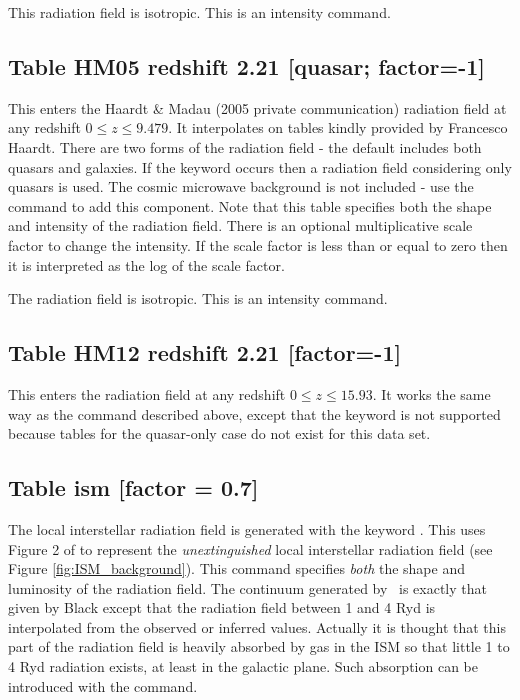 This radiation field is isotropic.
This is an intensity command.

\subsection{Table HM05 redshift 2.21 [quasar; factor=-1]}

This enters the Haardt \& Madau (2005 private communication)
radiation field at any redshift $0 \le z \le 9.479$.  It
interpolates on tables kindly provided by Francesco Haardt.  There are
two forms of the radiation field - the default includes both quasars
and galaxies.  If the keyword  occurs then a
radiation field considering only quasars is used.  The cosmic
microwave background is not included - use the  command
to add this component.  Note that this table specifies both the shape
and intensity of the radiation field.  There is an optional
multiplicative scale factor to change the intensity.  If the scale
factor is less than or equal to zero then it is interpreted as the log
of the scale factor.

The radiation field is isotropic.
This is an intensity command.

\subsection{Table HM12 redshift 2.21 [factor=-1]}

This enters the \citet{HaardtMadau2012} radiation field at any redshift $0 \le
z \le 15.93$. It works the same way as the  command
described above, except that the keyword  is not supported
because tables for the quasar-only case do not exist for this data set.

\subsection{Table ism [factor = 0.7]}

The local interstellar radiation field is generated with the keyword
.
This uses Figure 2 of \citet{Black1987} to represent the
\emph{unextinguished}
local interstellar radiation field (see Figure \ref{fig:ISM_background}).  This command specifies
\emph{both} the shape and luminosity of the radiation field.
The continuum
generated by \Cloudy\ is exactly that given by Black except that the radiation
field between 1 and 4 Ryd is interpolated from the observed or inferred
values.  Actually it is thought that this part of the radiation field is
heavily absorbed by gas in the ISM so that little 1 to 4 Ryd radiation
exists, at least in the galactic plane.  Such absorption can be introduced
with the  command.

